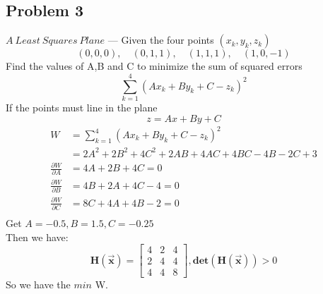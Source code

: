\documentclass[12pt,a4paper]{article}
\begin{document}
\begin{spacing}{1.5}
\section{Problem 3}
$A\ Least\ Squares\ Plane$ --- Given the four points $(x_k,y_k,z_k)$
\[
(0,0,0),\quad (0,1,1),\quad (1,1,1),\quad (1,0,-1)
\]
Find the values of A,B and C to minimize the sum of squared errors
\[
\sum_{k=1}^4 (Ax_k + By_k + C - z_k)^2
\]
If the points must line in the plane 
\[
z=Ax+By+C
\]
\begin{equation*}
    \begin{aligned}
        W &= \sum_{k=1}^4 (Ax_k + By_k + C - z_k)^2 \\
          &= 2A^2+2B^2+4C^2+2AB+4AC+4BC-4B-2C+3 \\
        \frac{\partial W}{\partial A}
          &= 4A+2B+4C = 0 \\
        \frac{\partial W}{\partial B}
          &= 4B+2A+4C-4 = 0 \\
        \frac{\partial W}{\partial C}
          &= 8C+4A+4B-2 = 0 \\
    \end{aligned}
\end{equation*} 
Get $A=-0.5,B=1.5,C=-0.25$ \\
Then we have:
\[
\mathbf{H(\vec{x})} = 
\begin{bmatrix} 
4 & 2 & 4 \\
2 & 4 & 4 \\
4 & 4 & 8 
\end{bmatrix},
\mathbf{det(H(\vec{x}))} > 0
\]
So we have the $min$ W.



\end{spacing}
\end{document}
